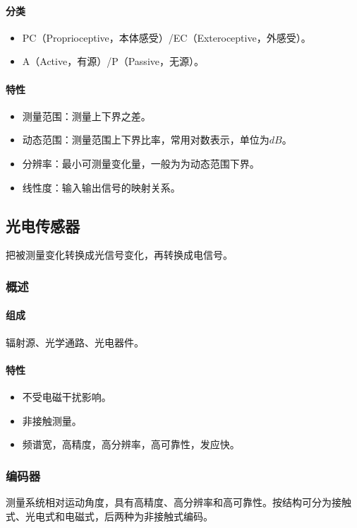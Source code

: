 \documentclass[
12pt, %
a4paper, 
oneside, %
headinclude,footinclude, %
]{scrartcl}
\begin{document}
\paragraph{分类}
\begin{itemize}
\item PC（Proprioceptive，本体感受）/EC（Exteroceptive，外感受）。
\item A（Active，有源）/P（Passive，无源）。
\end{itemize}
\paragraph{特性}
\begin{itemize}
\item 测量范围：测量上下界之差。    
\item 动态范围：测量范围上下界比率，常用对数表示，单位为$ dB $。
\item 分辨率：最小可测量变化量，一般为为动态范围下界。
\item 线性度：输入输出信号的映射关系。
\end{itemize}
\subsection[光电传感器]{光电传感器}
把被测量变化转换成光信号变化，再转换成电信号。
\subsubsection[概述]{概述}
\paragraph{组成}
辐射源、光学通路、光电器件。
\paragraph{特性}
\begin{itemize}
\item 不受电磁干扰影响。
\item 非接触测量。
\item 频谱宽，高精度，高分辨率，高可靠性，发应快。
\end{itemize}
\subsubsection[编码器]{编码器}
测量系统相对运动角度，具有高精度、高分辨率和高可靠性。按结构可分为接触式、光电式和电磁式，后两种为非接触式编码。
\end{document}
